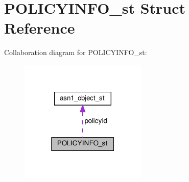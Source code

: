 \hypertarget{structPOLICYINFO__st}{}\section{P\+O\+L\+I\+C\+Y\+I\+N\+F\+O\+\_\+st Struct Reference}
\label{structPOLICYINFO__st}


Collaboration diagram for P\+O\+L\+I\+C\+Y\+I\+N\+F\+O\+\_\+st\+:
\nopagebreak
\begin{figure}[H]
\begin{center}
\leavevmode
\includegraphics[width=171pt]{structPOLICYINFO__st__coll__graph}
\end{center}
\end{figure}
